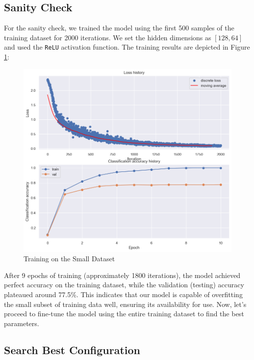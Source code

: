 \documentclass[10pt,a4paper,twoside]{tau}
\begin{document}
\subsection{Sanity Check}

For the sanity check, we trained the model using the first 500 samples of the training dataset for 2000 iterations. We set the hidden dimensions as $[128, 64]$ and used the \texttt{ReLU} activation function. The training results are depicted in Figure \ref{fig:sanity-check}:

\begin{figure}[hbp]
    \centering
    \includegraphics[scale=0.35]{images/sanity_check.png}
    \caption{Training on the Small Dataset}
    \label{fig:sanity-check}
\end{figure}

After 9 epochs of training (approximately 1800 iterations), the model achieved perfect accuracy on the training dataset, while the validation (testing) accuracy plateaued around 77.5\%. This indicates that our model is capable of overfitting the small subset of training data well, ensuring its availability for use. Now, let's proceed to fine-tune the model using the entire training dataset to find the best parameters.


\subsection{Search Best Configuration}
\end{document}
